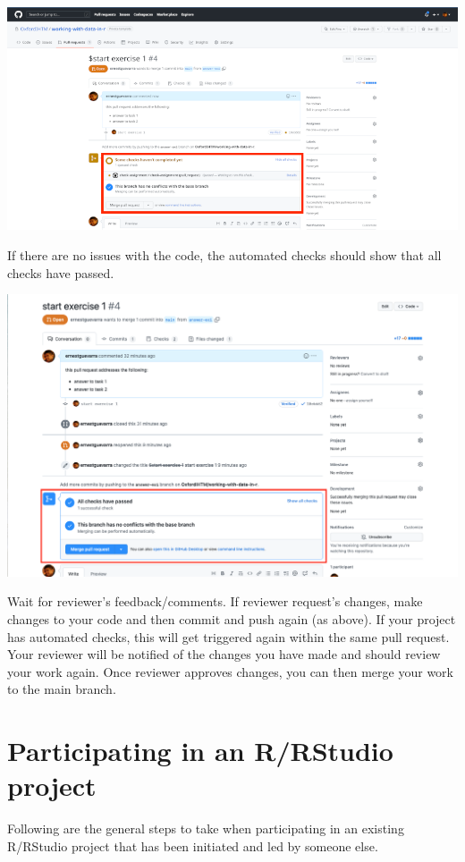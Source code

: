 \documentclass[
  12pt,
]{book}
\begin{document}
\includegraphics{images/pull_request5.png}

If there are no issues with the code, the automated checks should show that all checks have passed.

\includegraphics{images/pull_request6.png}

Wait for reviewer's feedback/comments. If reviewer request's changes, make changes to your code and then commit and push again (as above). If your project has automated checks, this will get triggered again within the same pull request. Your reviewer will be notified of the changes you have made and should review your work again. Once reviewer approves changes, you can then merge your work to the main branch.

\hypertarget{participate-projects}{%
\chapter{Participating in an R/RStudio project}\label{participate-projects}}

Following are the general steps to take when participating in an existing R/RStudio project that has been initiated and led by someone else.
\end{document}
